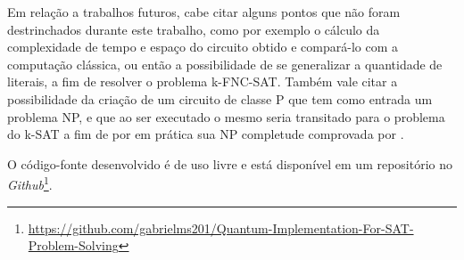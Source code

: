 \documentclass[12pt]{article}
\begin{document}
Em relação a trabalhos futuros, cabe citar alguns pontos que não foram destrinchados durante este trabalho, como por exemplo o cálculo da complexidade de tempo e espaço do circuito obtido e compará-lo com a computação clássica, ou então a possibilidade de se generalizar a quantidade de literais, a fim de resolver o problema k-FNC-SAT.
Também vale citar a possibilidade da criação de um circuito de classe P que tem como entrada um problema NP, e que ao ser executado o mesmo seria transitado para o problema do k-SAT a fim de por em prática sua NP completude comprovada por \cite{cook:71}. 

O código-fonte desenvolvido é de uso livre e está disponível em um repositório no \textit{Github}\footnote{
\url{https://github.com/gabrielms201/Quantum-Implementation-For-SAT-Problem-Solving}}.



\end{document}
